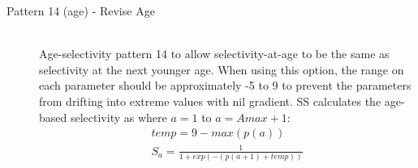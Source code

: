 \begin{description}
	\item[Pattern 14 (age) - Revise Age]\hfil\\
	Age-selectivity pattern 14 to allow selectivity-at-age to be the same as selectivity at the next younger age.  When using this option, the range on each parameter should be approximately -5 to 9 to prevent the parameters from drifting into extreme values with nil gradient. SS calculates the age-based selectivity as where $a = 1$ to $a = Amax + 1$:
	\begin{equation}
		 \begin{split}
		 temp = 9 - max(p(a))\\
		S_a = \frac{1}{1+exp(-(p(a+1) + temp))}
		\end{split}
	\end{equation}	
\end{description}

